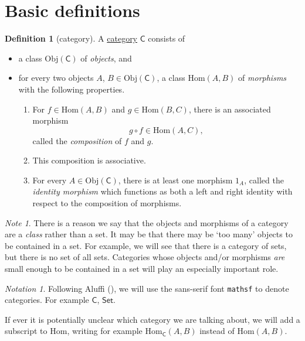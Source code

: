 \documentclass[a4paper,10pt]{scrreprt}
\newcommand{\defn}[1]{\ul{#1}}
\newcommand{\Obj}{\mathrm{Obj}}
\newcommand{\Hom}{\mathrm{Hom}}
\theoremstyle{definition}
\newtheorem{definition}{Definition}[section]
\theoremstyle{plain}
\theoremstyle{remark}
\newtheorem{note}{Note}[section]
\newtheorem{notation}{Notation}[section]
\begin{document}
\section{Basic definitions} \label{sec:categoriesbasicdefinitions}
\begin{definition}[category] 
  \label{def:category} 
  A \defn{category} $\mathsf{C}$ consists of 
  \begin{itemize} 
    \item a class $\Obj(\mathsf{C})$ of \emph{objects}, and \item for every two objects $A$, $B \in \Obj(\mathsf{C})$, a class $\Hom(A,B)$ of \emph{morphisms} with the following properties.  
      \begin{enumerate} 
        \item \label{item:compositionofmorphisms} For $f \in \Hom(A,B)$ and $g \in \Hom(B,C)$, there is an associated morphism 
          \begin{equation*} 
            g \circ f \in \Hom(A,C), 
          \end{equation*} called the \emph{composition} of $f$ and $g$.

        \item This composition is associative.

        \item \label{item:existenceofidentitymorphism} For every $A \in \Obj(\mathsf{C})$, there is at least one morphism $1_{A}$, called the \emph{identity morphism} which functions as both a left and right identity with respect to the composition of morphisms.

      \end{enumerate} 
  \end{itemize} 
\end{definition}

\begin{note}
  There is a reason we say that the objects and morphisms of a category are a \emph{class} rather than a set. It may be that there may be `too many' objects to be contained in a set. For example, we will see that there is a category of sets, but there is no set of all sets. Categories whose objects and/or morphisms \emph{are} small enough to be contained in a set will play an especially important role.
\end{note}

\begin{notation}
  Following Aluffi (\cite{aluffi-algebra-chapter-0}), we will use the sans-serif font \texttt{mathsf} to denote categories. For example $\mathsf{C}$, $\mathsf{Set}$.

  If ever it is potentially unclear which category we are talking about, we will add a subscript to $\Hom$, writing for example $\Hom_{\mathsf{C}}(A,B)$ instead of $\Hom(A,B)$.
\end{notation}
\end{document}
